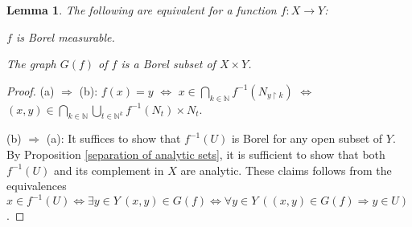 \documentclass[10pt]{amsart}
\newcommand{\NN}{\mathbb{N}}
\newtheorem{lemma}[theorem]{Lemma}
\theoremstyle{definition}
\theoremstyle{remark}
\newenvironment{enumerate-(a)}{\begin{enumerate}[label={\upshape (\alph*)}, leftmargin=2pc]}{\end{enumerate}}
\begin{document}
\begin{lemma} 
The following are equivalent for a function $f\colon X\rightarrow Y$: 
\begin{enumerate-(a)} 
\item 
$f$ is Borel measurable. 
\item 
The graph $G(f)$ of $f$ is a Borel subset of $X\times Y$. 
\end{enumerate-(a)} 
\end{lemma} 
\begin{proof} 
(a) $\Rightarrow$ (b): $f(x)=y$ $\Longleftrightarrow$ $x\in \bigcap_{k\in \NN} f^{-1}(N_{y{\upharpoonright}k})$ $\Longleftrightarrow$ $(x,y)\in \bigcap_{k\in\NN} \bigcup_{t\in \NN^k} f^{-1}(N_t) \times N_t$. 

(b) $\Rightarrow$ (a): 
It suffices to show that $f^{-1}(U)$ is Borel for any open subset of $Y$. 
By Proposition \ref{separation of analytic sets}, it is sufficient to show that both $f^{-1}(U)$ and its complement in $X$ are analytic. 
These claims follows from the equivalences $x\in f^{-1}(U) \Longleftrightarrow \exists y\in Y\ (x,y)\in G(f) \Longleftrightarrow \forall y\in Y\ ((x,y)\in G(f)\Rightarrow y\in U)$. 
\end{proof} 











%
%



















 
 












  
\end{document}
